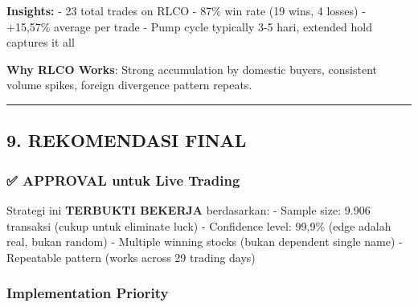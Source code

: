 \documentclass[
  10pt,
  a4paper,
]{article}
\begin{document}
\textbf{Insights:} - 23 total trades on RLCO - 87\% win rate (19 wins, 4
losses) - +15,57\% average per trade - Pump cycle typically 3-5 hari,
extended hold captures it all

\textbf{Why RLCO Works}: Strong accumulation by domestic buyers,
consistent volume spikes, foreign divergence pattern repeats.

\begin{center}\rule{0.5\linewidth}{0.5pt}\end{center}

\subsection{9. REKOMENDASI FINAL}\label{rekomendasi-final}

\subsubsection{✅ APPROVAL untuk Live
Trading}\label{approval-untuk-live-trading}

Strategi ini \textbf{TERBUKTI BEKERJA} berdasarkan: - Sample size: 9.906
transaksi (cukup untuk eliminate luck) - Confidence level: 99,9\% (edge
adalah real, bukan random) - Multiple winning stocks (bukan dependent
single name) - Repeatable pattern (works across 29 trading days)

\subsubsection{Implementation Priority}\label{implementation-priority}
\end{document}
